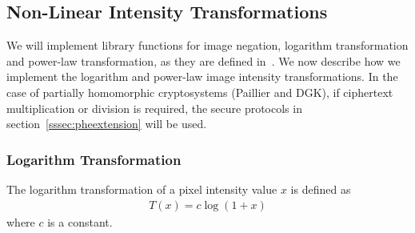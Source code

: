 
\subsection{Non-Linear Intensity Transformations}
We will implement library functions for image negation, logarithm transformation and power-law transformation, as they are defined in~\cite{gonzalez_digital_2008}.
We now describe how we implement the logarithm and power-law image intensity transformations. In the case of partially homomorphic cryptosystems (Paillier and DGK), if ciphertext multiplication or division is required, the secure protocols in section~\ref{sssec:pheextension} will be used.

\subsubsection{Logarithm Transformation}
The logarithm transformation of a pixel intensity value $x$ is defined as
\begin{align}
	T\left(x\right) = c \log\left(1 + x\right)
\end{align}
where $c$ is a constant.

